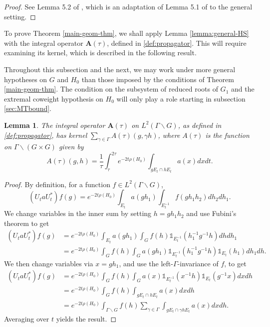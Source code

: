 \documentclass[12pt]{amsart}
\newtheorem{lemma}[theorem]{Lemma}
\theoremstyle{remark}
\begin{document}
\begin{proof}
See Lemma 5.2 of \cite{Brumley_Matz_23}, which is an adaptation of Lemma 5.1 of \cite{Le_Masson_Sahlsten_17} to the general setting.
\end{proof}


To prove Theorem \ref{main-geom-thm}, we shall apply Lemma \ref{lemma:general-HS} with the integral operator $\mathbf{A}(\tau)$, defined in \eqref{def:propagator}. This will require examining its kernel, which is described in the following result.

Throughout this subsection and the next, we may work under more general hypotheses on $G$ and $H_0$ than those imposed by the conditions of Theorem \ref{main-geom-thm}. The condition on the subsystem of reduced roots of $G_1$ and the extremal coweight hypothesis on $H_0$ will only play a role starting in subsection \ref{sec:MTbound}.

\begin{lemma}\label{lemma:kernel}
The integral operator $\mathbf{A}(\tau)$ on $L^2(\Gamma\backslash G)$, as defined in \eqref{def:propagator}, has kernel \; $\sum_{\gamma\in\Gamma} A(\tau)(g,\gamma h)$, where $A(\tau)$ is the  function on $\Gamma\backslash (G\times G)$ given by
\[
A(\tau)(g,h)=\frac{1}{\tau}\int_{\tau}^{2\tau} e^{-2t\rho(H_0)}\int_{gE_t\cap hE_t}a(x)dx dt.
\]
\end{lemma}

\begin{proof}
By definition, for a function $f \in L^2(\Gamma \backslash G)$,
\[
(U_t aU_t^*)f(g)=e^{-2t\rho(H_0)}\int_{E_t}a(gh_1)\int_{E_t^{-1}} f(gh_1h_2)dh_2dh_1.
\]
We change variables in the inner sum by setting $h=gh_1h_2$ and use Fubini's theorem to get
\begin{align*}
(U_t aU_t^*)f(g)&=e^{-2t\rho(H_0)}\int_{E_t}a(gh_1)\int_G f(h){\mathds{1}}_{E_t^{-1}}(h_1^{-1}g^{-1}h)dhdh_1\\
&=e^{-2t\rho(H_0)}\int_G f(h)\int_G a(gh_1){\mathds{1}}_{E_t^{-1}}(h_1^{-1}g^{-1}h){\mathds{1}}_{E_t}(h_1)dh_1 dh.
\end{align*}
We then change variables via $x=gh_1$, and use the left-$\Gamma$-invariance of $f$, to get
\begin{align*}
(U_t aU_t^*)f(g)&=e^{-2t\rho(H_0)}\int_G f(h)\int_G a(x){\mathds{1}}_{E_t^{-1}}(x^{-1}h){\mathds{1}}_{E_t}(g^{-1}x)dx dh\\
&=e^{-2t\rho(H_0)}\int_G f(h)\int_{gE_t\cap hE_t} a(x)dx dh\\
&=e^{-2t\rho(H_0)}\int_{\Gamma\backslash G} f(h)\sum_{\gamma\in\Gamma} \int_{gE_t\cap \gamma hE_t} a(x)dx dh.
\end{align*}
Averaging over $t$ yields the result.
\end{proof}
\end{document}
